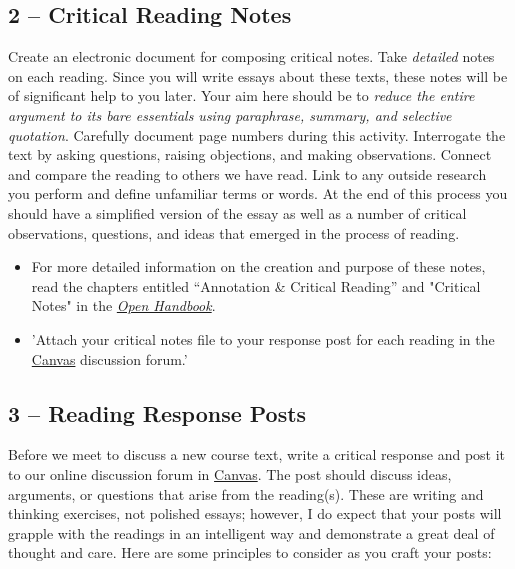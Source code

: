 \documentclass[letterpaper]{article}
\def\mylib#1{'#1'}%
\begin{document}
\subsection*{2 -- Critical Reading Notes }
Create an electronic document for composing critical notes. Take \emph{detailed} notes on each reading. Since you will write essays about these texts, these notes will be of significant help to you later. Your aim here should be to \emph{reduce the entire argument to its bare essentials using paraphrase, summary, and selective quotation}. Carefully document page numbers during this activity. Interrogate the text by asking questions, raising objections, and making observations. Connect and compare the reading to others we have read. Link to any outside research you perform and define unfamiliar terms or words. At the end of this process you should have a simplified version of the essay as well as a number of critical observations, questions, and ideas that emerged in the process of reading. 

\begin{itemize}
\item For more detailed information on the creation and purpose of these notes, read the chapters entitled ``Annotation \& Critical Reading'' and "Critical Notes" in the \href{https://github.com/stockphrase/OpenHandbook/raw/master/Open%20Handbook.pdf}{\emph{Open Handbook}}. 


\item \mylib{Attach your critical notes file to your response post for each reading in the \href{https://canvas.dartmouth.edu}{Canvas} discussion forum.} 
\end{itemize}

\subsection*{3 -- Reading Response Posts}

Before we meet to discuss a new course text, write a critical response and post it to our online discussion forum in \href{https://canvas.dartmouth.edu}{Canvas}. The post should discuss ideas, arguments, or questions that arise from the reading(s). These are writing and thinking exercises, not polished essays; however, I do expect that your posts will grapple with the readings in an intelligent way and demonstrate a great deal of thought and care. Here are some principles to consider as you craft your posts:
\end{document}
